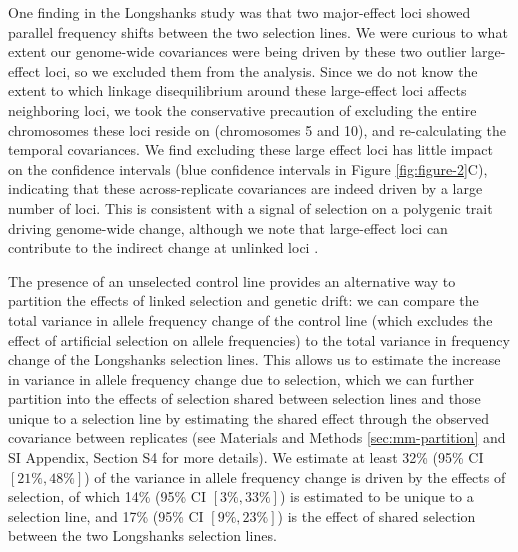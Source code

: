 \documentclass[9pt,twocolumn,twoside]{pnas-new}
\begin{document}
One finding in the Longshanks study was that two major-effect loci showed
parallel frequency shifts between the two selection lines. We were curious to
what extent our genome-wide covariances were being driven by these two outlier
large-effect loci, so we excluded them from the analysis. Since we do not know
the extent to which linkage disequilibrium around these large-effect loci
affects neighboring loci, we took the conservative precaution of excluding the
entire chromosomes these loci reside on (chromosomes 5 and 10), and
re-calculating the temporal covariances. We find excluding these large effect
loci has little impact on the confidence intervals (blue confidence intervals
in Figure \ref{fig:figure-2}C), indicating that these across-replicate
covariances are indeed driven by a large number of loci. This is consistent
with a signal of selection on a polygenic trait driving genome-wide change,
although we note that large-effect loci can contribute to the indirect change
at unlinked loci \cite{Robertson1961-ho,Santiago1995-hx}. 

The presence of an unselected control line provides an alternative way to
partition the effects of linked selection and genetic drift: we can compare the
total variance in allele frequency change of the control line (which excludes
the effect of artificial selection on allele frequencies) to the total variance
in frequency change of the Longshanks selection lines. This allows us to
estimate the increase in variance in allele frequency change due to selection,
which we can further partition into the effects of selection shared between
selection lines and those unique to a selection line by estimating the shared
effect through the observed covariance between replicates (see Materials and
Methods \ref{sec:mm-partition} and SI Appendix, Section S4 for more details).
We estimate at least 32\% (95\% CI $[21\%, 48\%]$) of the variance in allele
frequency change is driven by the effects of selection, of which 14\% (95\% CI
$[3\%, 33\%]$) is estimated to be unique to a selection line, and 17\% (95\% CI
$[9\%, 23\%]$) is the effect of shared selection between the two Longshanks
selection lines. 
\end{document}
